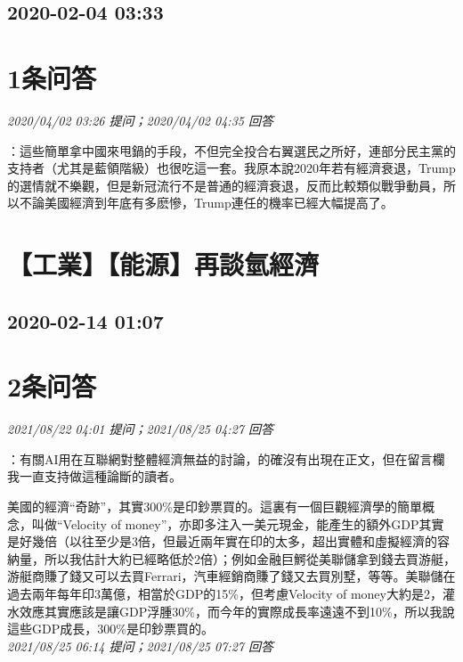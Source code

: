 \documentclass[twocolumn]{ctexart}
\begin{document}
\subsection{2020-02-04 03:33}


\section{1条问答}

\textit{\hfill\noindent\small 2020/04/02 03:26 提问；2020/04/02 04:35 回答}

：這些簡單拿中國來甩鍋的手段，不但完全投合右翼選民之所好，連部分民主黨的支持者（尤其是藍領階級）也很吃這一套。我原本說2020年若有經濟衰退，Trump的選情就不樂觀，但是新冠流行不是普通的經濟衰退，反而比較類似戰爭動員，所以不論美國經濟到年底有多麽慘，Trump連任的機率已經大幅提高了。
\\


\section{【工業】【能源】再談氫經濟}
\subsection{2020-02-14 01:07}


\section{2条问答}

\textit{\hfill\noindent\small 2021/08/22 04:01 提问；2021/08/25 04:27 回答}

：有關AI用在互聯網對整體經濟無益的討論，的確沒有出現在正文，但在留言欄我一直支持做這種論斷的讀者。

美國的經濟“奇跡”，其實300\%是印鈔票買的。這裏有一個巨觀經濟學的簡單概念，叫做“Velocity of money”，亦即多注入一美元現金，能產生的額外GDP其實是好幾倍（以往至少是3倍，但最近兩年實在印的太多，超出實體和虛擬經濟的容納量，所以我估計大約已經略低於2倍）；例如金融巨鰐從美聯儲拿到錢去買游艇，游艇商賺了錢又可以去買Ferrari，汽車經銷商賺了錢又去買別墅，等等。美聯儲在過去兩年每年印3萬億，相當於GDP的15\%，但考慮Velocity of money大約是2，灌水效應其實應該是讓GDP浮腫30\%，而今年的實際成長率遠遠不到10\%，所以我說這些GDP成長，300\%是印鈔票買的。
\\

\textit{\hfill\noindent\small 2021/08/25 06:14 提问；2021/08/25 07:27 回答}
\end{document}
